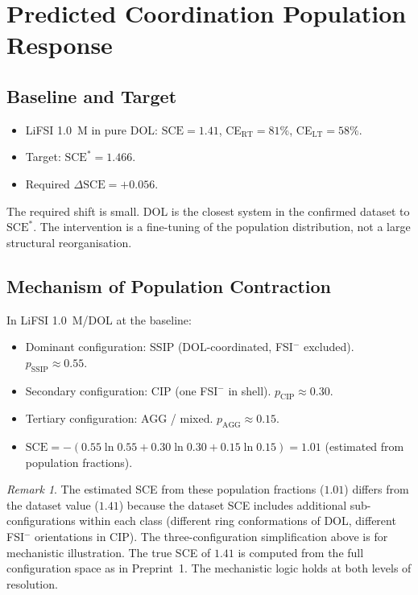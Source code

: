 \documentclass[11pt]{article}
\theoremstyle{plain}
\theoremstyle{definition}
\theoremstyle{remark}
\newtheorem{remark}{Remark}[section]
\begin{document}
\section{Predicted Coordination Population Response}
\label{sec:population}

\subsection{Baseline and Target}

\begin{itemize}[leftmargin=2em]
  \item LiFSI 1.0~M in pure DOL: $\mathrm{SCE} = 1.41$,
        CE$_{\mathrm{RT}} = 81\%$, CE$_{\mathrm{LT}} = 58\%$.
  \item Target: $\mathrm{SCE}^{*} = 1.466$.
  \item Required $\Delta\mathrm{SCE} = +0.056$.
\end{itemize}

The required shift is small.  DOL is the closest system in the
confirmed dataset to $\mathrm{SCE}^{*}$.  The intervention is a
fine-tuning of the population distribution, not a large structural
reorganisation.

\subsection{Mechanism of Population Contraction}

In LiFSI 1.0~M/DOL at the baseline:
\begin{itemize}[leftmargin=2em]
  \item Dominant configuration: SSIP (DOL-coordinated, FSI$^-$
        excluded).  $p_{\mathrm{SSIP}} \approx 0.55$.
  \item Secondary configuration: CIP (one FSI$^-$ in shell).
        $p_{\mathrm{CIP}} \approx 0.30$.
  \item Tertiary configuration: AGG / mixed.
        $p_{\mathrm{AGG}} \approx 0.15$.
  \item $\mathrm{SCE} = -(0.55\ln 0.55 + 0.30\ln 0.30 + 0.15\ln 0.15)
        = 1.01$ (estimated from population fractions).
\end{itemize}

\begin{remark}
The estimated SCE from these population fractions ($1.01$) differs from
the dataset value ($1.41$) because the dataset SCE includes additional
sub-configurations within each class (different ring conformations of
DOL, different FSI$^-$ orientations in CIP).  The three-configuration
simplification above is for mechanistic illustration.  The true SCE
of $1.41$ is computed from the full configuration space as in Preprint~1.
The mechanistic logic holds at both levels of resolution.
\end{remark}
\end{document}
